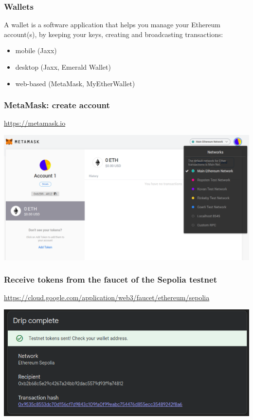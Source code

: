 \documentclass[11pt]{beamer}  %
\begin{document}
\begin{frame}\frametitle{Wallets}

  \begin{greenbox}{}
    A wallet is a
    software application that helps you manage your Ethereum account(s),
    by keeping your keys, creating and broadcasting transactions:
    \begin{itemize}
    \item mobile (Jaxx)
    \item desktop (Jaxx, Emerald Wallet)
    \item web-based (MetaMask, MyEtherWallet)
    \end{itemize}
  \end{greenbox}

\end{frame}

\begin{frame}\frametitle{MetaMask: create account}

  \url{https://metamask.io}
  \begin{center}
    \includegraphics[width=\textwidth,clip=false]{pictures/metamask-account.png}
  \end{center}

\end{frame}

\begin{frame}\frametitle{Receive tokens from the faucet of the Sepolia testnet}

  \url{https://cloud.google.com/application/web3/faucet/ethereum/sepolia}

  \begin{center}
    \includegraphics[scale=0.4,clip=false]{pictures/sepolia-faucet.png}
  \end{center}

\end{frame}
\end{document}
